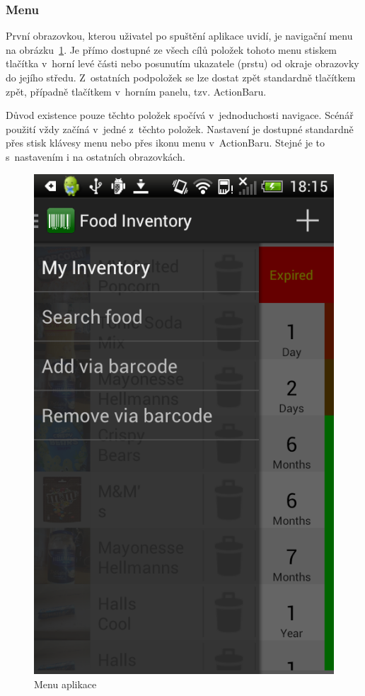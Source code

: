 \documentclass[thesis=B,czech]{FITthesis}[2013/10/20]
\begin{document}
\clearpage

\subsubsection{Menu}

První obrazovkou, kterou uživatel po spuštění aplikace uvidí, je navigační menu na obrázku~\ref{fig:AppMenu}. Je přímo dostupné ze všech cílů položek tohoto menu stiskem tlačítka v~horní levé části nebo posunutím ukazatele (prstu) od okraje obrazovky do jejího středu. Z~ostatních podpoložek se lze dostat zpět standardně tlačítkem zpět, případně tlačítkem v~horním panelu, tzv. ActionBaru.

Důvod existence pouze těchto položek spočívá v~jednoduchosti navigace. Scénář použití vždy začíná v~jedné z~těchto položek. Nastavení je dostupné standardně přes stisk klávesy menu nebo přes ikonu menu v~ActionBaru. Stejné je to s~nastavením i na ostatních obrazovkách.

\begin{figure}[H]
  \centering
  \includegraphics[scale=0.4]{screenshots/app_menu.png}
  \caption{Menu aplikace}
  \label{fig:AppMenu}
\end{figure}
\end{document}
